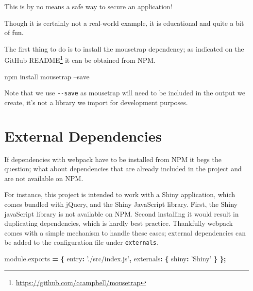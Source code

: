 \documentclass[10pt,]{krantz}
\makeatletter
\newenvironment{Shaded}{\begin{snugshade}}{\end{snugshade}}
\newcommand{\AttributeTok}[1]{\textcolor[rgb]{0.61,0.61,0.61}{#1}}
\newcommand{\DataTypeTok}[1]{\textcolor[rgb]{0.27,0.27,0.27}{#1}}
\newcommand{\ExtensionTok}[1]{#1}
\newcommand{\NormalTok}[1]{#1}
\newcommand{\OperatorTok}[1]{\textcolor[rgb]{0.43,0.43,0.43}{\textbf{#1}}}
\newcommand{\StringTok}[1]{\textcolor[rgb]{0.5,0.5,0.5}{#1}}
\newcommand{\VariableTok}[1]{\textcolor[rgb]{0,0,0}{#1}}
\renewcommand{\href}[2]{#2\footnote{\url{#1}}}
\newenvironment{kframe}{%
\medskip{}
\setlength{\fboxsep}{.8em}
 \def\at@end@of@kframe{}%
 \ifinner\ifhmode%
  \def\at@end@of@kframe{\end{minipage}}%
  \begin{minipage}{\columnwidth}%
 \fi\fi%
 \def\FrameCommand##1{\hskip\@totalleftmargin \hskip-\fboxsep
 \colorbox{shadecolor}{##1}\hskip-\fboxsep
     \hskip-\linewidth \hskip-\@totalleftmargin \hskip\columnwidth}%
 \MakeFramed {\advance\hsize-\width
   \@totalleftmargin\z@ \linewidth\hsize
   \@setminipage}}%
 {\par\unskip\endMakeFramed%
 \at@end@of@kframe}
\renewenvironment{Shaded}{\begin{kframe}}{\end{kframe}}
\newenvironment{rmdblock}[1]
  {
  \begin{itemize}
  \renewcommand{\labelitemi}{
    \raisebox{-.7\height}[0pt][0pt]{
      {\setkeys{Gin}{width=3em,keepaspectratio}\texttt{[image: images/\#1]}}
    }
  }
  \setlength{\fboxsep}{1em}
  \begin{kframe}
  \item
  }
  {
  \end{kframe}
  \end{itemize}
  }
\newenvironment{rmdnote}
  {\begin{rmdblock}{note}}
  {\end{rmdblock}}
\makeatother
\begin{document}
\begin{rmdnote}
This is by no means a safe way to secure an application!
\end{rmdnote}

Though it is certainly not a real-world example, it is educational and quite a bit of fun.

The first thing to do is to install the mousetrap dependency; as indicated on the \href{https://github.com/ccampbell/mousetrap}{GitHub README} it can be obtained from NPM.

\begin{Shaded}
\begin{Highlighting}[]
\ExtensionTok{npm}\NormalTok{ install mousetrap --save}
\end{Highlighting}
\end{Shaded}

Note that we use \texttt{-\/-save} as mousetrap will need to be included in the output we create, it's not a library we import for development purposes.

\hypertarget{webpack-intro-external-dependencies}{%
\section{External Dependencies}\label{webpack-intro-external-dependencies}}

If dependencies with webpack have to be installed from NPM it begs the question; what about dependencies that are already included in the project and are not available on NPM.

For instance, this project is intended to work with a Shiny application, which comes bundled with jQuery, and the Shiny JavaScript library. First, the Shiny javaScript library is not available on NPM. Second installing it would result in duplicating dependencies, which is hardly best practice. Thankfully webpack comes with a simple mechanism to handle these cases; external dependencies can be added to the configuration file under \texttt{externals}.

\begin{Shaded}
\begin{Highlighting}[]
\VariableTok{module}\NormalTok{.}\AttributeTok{exports} \OperatorTok{=} \OperatorTok{\{}
  \DataTypeTok{entry}\OperatorTok{:} \StringTok{'./src/index.js'}\OperatorTok{,}
  \DataTypeTok{externals}\OperatorTok{:} \OperatorTok{\{}
    \DataTypeTok{shiny}\OperatorTok{:} \StringTok{'Shiny'}
  \OperatorTok{\}}
\OperatorTok{\};}
\end{Highlighting}
\end{Shaded}
\end{document}

